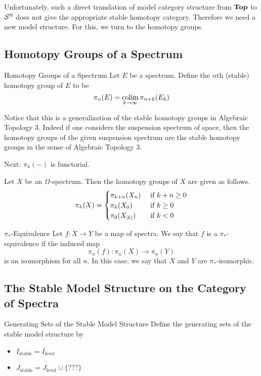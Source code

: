 \documentclass[a4paper]{article}
\begin{document}
Unfortunately, such a direct translation of model category structure from $\bold{Top}$ to $\mathcal{S}^{\mathbb{N}}$ does not give the appropriate stable homotopy category. Therefore we need a new model structure. For this, we turn to the homotopy groups. 

\subsection{Homotopy Groups of a Spectrum}
\begin{defn}{Homotopy Groups of a Spectrum}{} Let $E$ be a spectrum. Define the $n$th (stable) homotopy group of $E$ to be $$\pi_n(E)=\operatorname*{colim}_{k\to\infty}\pi_{n+k}(E_k)$$
\end{defn}

Notice that this is a generalization of the stable homotopy groups in Algebraic Topology 3. Indeed if one considers the suspension spectrum of space, then the homotopy groups of the given suspension spectrum are the stable homotopy groups in the sense of Algebraic Topology 3. 

Next: $\pi_k(-)$ is functorial. 

\begin{prp}{}{} Let $X$ be an $\Omega$-spectrum. Then the homotopy groups of $X$ are given as follows. $$\pi_k(X)=\begin{cases}
\pi_{k+n}(X_n) & \text{ if } k+n\geq 0\\
\pi_k(X_0) & \text{ if } k\geq 0\\
\pi_0(X_{\abs{k}}) & \text{ if } k<0
\end{cases}$$
\end{prp}

\begin{defn}{$\pi_\ast$-Equivalence}{} Let $f:X\to Y$ be a map of spectra. We say that $f$ is a $\pi_\ast$-equivalence if the induced map $$\pi_n(f):\pi_n(X)\to\pi_n(Y)$$ is an isomorphism for all $n$. In this case, we say that $X$ and $Y$ are $\pi_\ast$-isomorphic. 
\end{defn}

\subsection{The Stable Model Structure on the Category of Spectra}
\begin{defn}{Generating Sets of the Stable Model Structure}{} Define the generating sets of the stable model structure by
\begin{itemize}
\item $I_\text{stable}=I_\text{level}$
\item $J_\text{stable}=J_\text{level}\cup\{???\}$
\end{itemize}
\end{defn}
\end{document}
